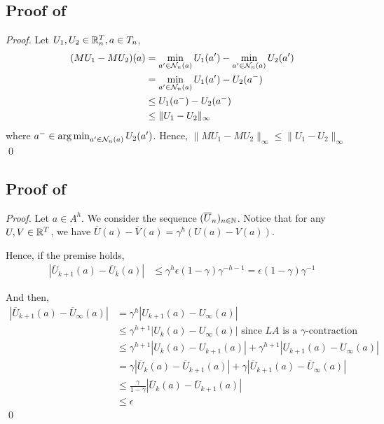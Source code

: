 \documentclass[runningheads]{llncs}
\begin{document}
\subsection{Proof of }
\begin{proof}
Let $U_1, U_2\in \mathbb{R}^T_n, a\in T_n$,
\begin{align*}
    (M U_1 - M U_2)(a) &= \min_{a'\in\mathcal{N}_n(a)} U_1(a') - \min_{a'\in\mathcal{N}_n(a)} U_2(a') \\
    &= \min_{a'\in\mathcal{N}_n(a)} U_1(a') - U_2(a^-) \\
    &\leq U_1(a^-) - U_2(a^-) \\
    &\leq \|U_1 - U_2\|_\infty
\end{align*}
where $a^-\in \operatorname*{arg\,min}_{a'\in\mathcal{N}_n(a)} U_2(a')$. 
Hence, $\|M U_1 - M U_2\|_\infty \leq \|U_1 - U_2\|_\infty$
\qed\end{proof}

\subsection{Proof of }

\begin{proof}
Let $a\in A^h$. We consider the sequence $(\overline{U}_n)_{n\in\mathbb{N}}$.
Notice that for any $U,V\in\mathbb{R}^T$, we have $\overline{U}(a)-\overline{V}(a)=\gamma^h(U(a)-V(a))$.

Hence, if the premise holds,
\begin{align*}
    |\overline{U}_{k+1}(a) - \overline{U}_{k}(a)| &\leq \gamma^h\epsilon (1-\gamma)\gamma^{-h-1} = \epsilon (1-\gamma)\gamma^{-1}
\end{align*}

And then,
\begin{align*}
|\overline{U}_{k+1}(a) - \overline{U}_\infty(a)| &= \gamma^h |U_{k+1}(a) - U_\infty(a)|\\
&\leq \gamma^{h+1}|U_{k}(a) - U_\infty(a)| \text{ since $LA$ is a $\gamma$-contraction}\\
&\leq \gamma^{h+1}|U_{k}(a) - U_{k+1}(a)| + \gamma^{h+1}|U_{k+1}(a) - U_\infty(a)|\\
&= \gamma|\overline{U}_{k}(a) - \overline{U}_{k+1}(a)| + \gamma |\overline{U}_{k+1}(a) - \overline{U}_\infty(a)|\\
&\leq \frac{\gamma}{1-\gamma} |\overline{U}_{k}(a) - \overline{U}_{k+1}(a)|\\
&\leq\epsilon
\end{align*}
\qed\end{proof}
\end{document}
